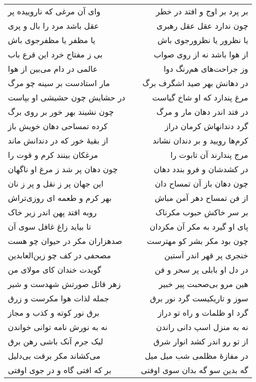 \begin{center}
\begin{longtable}{l p{0.5cm} r}
\\
وای آن مرغی که ناروییده پر
&&
بر پرد بر اوج و افتد در خطر
\\
عقل باشد مرد را بال و پری
&&
چون ندارد عقل عقل رهبری
\\
یا مظفر یا مظفرجوی باش
&&
یا نظرور یا نظرورجوی باش
\\
بی ز مفتاح خرد این قرع باب
&&
از هوا باشد نه از روی صواب
\\
عالمی در دام می‌بین از هوا
&&
وز جراحت‌های هم‌رنگ دوا
\\
مار استادست بر سینه چو مرگ
&&
در دهانش بهر صید اشگرف برگ
\\
در حشایش چون حشیشی او بپاست
&&
مرغ پندارد که او شاخ گیاست
\\
چون نشیند بهر خور بر روی برگ
&&
در فتد اندر دهان مار و مرگ
\\
کرده تمساحی دهان خویش باز
&&
گرد دندانهاش کرمان دراز
\\
از بقیهٔ خور که در دندانش ماند
&&
کرم‌ها رویید و بر دندان نشاند
\\
مرغکان بینند کرم و قوت را
&&
مرج پندارند آن تابوت را
\\
چون دهان پر شد ز مرغ او ناگهان
&&
در کشدشان و فرو بندد دهان
\\
این جهان پر ز نقل و پر ز نان
&&
چون دهان باز آن تمساح دان
\\
بهر کرم و طعمه ای روزی‌تراش
&&
از فن تمساح دهر آمن مباش
\\
روبه افتد پهن اندر زیر خاک
&&
بر سر خاکش حبوب مکرناک
\\
تا بیاید زاغ غافل سوی آن
&&
پای او گیرد به مکر آن مکردان
\\
صدهزاران مکر در حیوان چو هست
&&
چون بود مکر بشر کو مهترست
\\
مصحفی در کف چو زین‌العابدین
&&
خنجری پر قهر اندر آستین
\\
گویدت خندان کای مولای من
&&
در دل او بابلی پر سحر و فن
\\
زهر قاتل صورتش شهدست و شیر
&&
هین مرو بی‌صحبت پیر خبیر
\\
جمله لذات هوا مکرست و زرق
&&
سوز و تاریکیست گرد نور برق
\\
برق نور کوته و کذب و مجاز
&&
گرد او ظلمات و راه تو دراز
\\
نه به نورش نامه توانی خواندن
&&
نه به منزل اسپ دانی راندن
\\
لیک جرم آنک باشی رهن برق
&&
از تو رو اندر کشد انوار شرق
\\
می‌کشاند مکر برقت بی‌دلیل
&&
در مفازهٔ مظلمی شب میل میل
\\
بر که افتی گاه و در جوی اوفتی
&&
گه بدین سو گه بدان سوی اوفتی
\\

\end{longtable}
\end{center}

